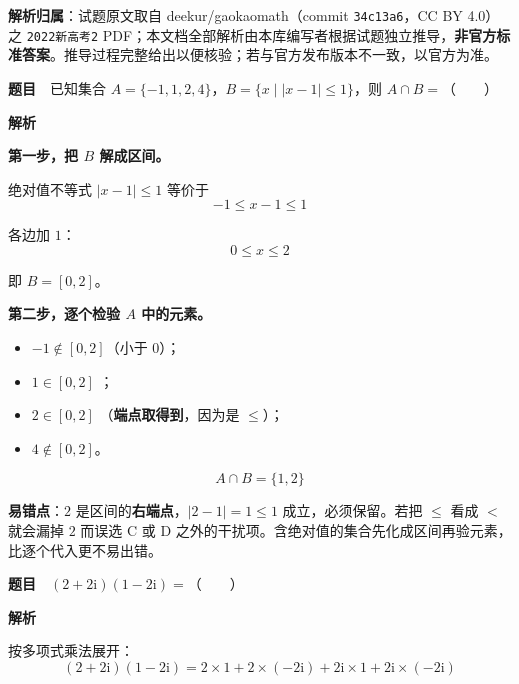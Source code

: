 

\begin{gknotice}
\textbf{解析归属}：试题原文取自 deekur/gaokaomath（commit \texttt{34c13a6}，CC BY 4.0）之 \texttt{2022新高考2} PDF；本文档全部解析由本库编写者根据试题独立推导，\textbf{非官方标准答案}。推导过程完整给出以便核验；若与官方发布版本不一致，以官方为准。
\end{gknotice}

\par\medskip



\textbf{题目}　已知集合 $A=\{-1,1,2,4\}$，$B=\{x\mid|x-1|\le1\}$，则 $A\cap B=$（　　）

\textbf{解析}

\textbf{第一步，把 $B$ 解成区间。}

绝对值不等式 $|x-1|\le1$ 等价于
\[-1\le x-1\le1\]

各边加 $1$：
\[0\le x\le2\]

即 $B=[0,2]$。

\textbf{第二步，逐个检验 $A$ 中的元素。}

\begin{itemize}
\item $-1\notin[0,2]$（小于 $0$）；
\item $1\in[0,2]$ ；
\item $2\in[0,2]$ （\textbf{端点取得到}，因为是 $\le$）；
\item $4\notin[0,2]$。
\end{itemize}

\[A\cap B=\{1,2\}\]


\begin{gktip}
\textbf{易错点}：$2$ 是区间的\textbf{右端点}，$|2-1|=1\le1$ 成立，必须保留。若把 $\le$ 看成 $<$ 就会漏掉 $2$ 而误选 C 或 D 之外的干扰项。含绝对值的集合先化成区间再验元素，比逐个代入更不易出错。
\end{gktip}

\par\medskip


\textbf{题目}　$(2+2\mathrm i)(1-2\mathrm i)=$（　　）

\textbf{解析}

按多项式乘法展开：
\[(2+2\mathrm i)(1-2\mathrm i)=2\times1+2\times(-2\mathrm i)+2\mathrm i\times1+2\mathrm i\times(-2\mathrm i)\]

